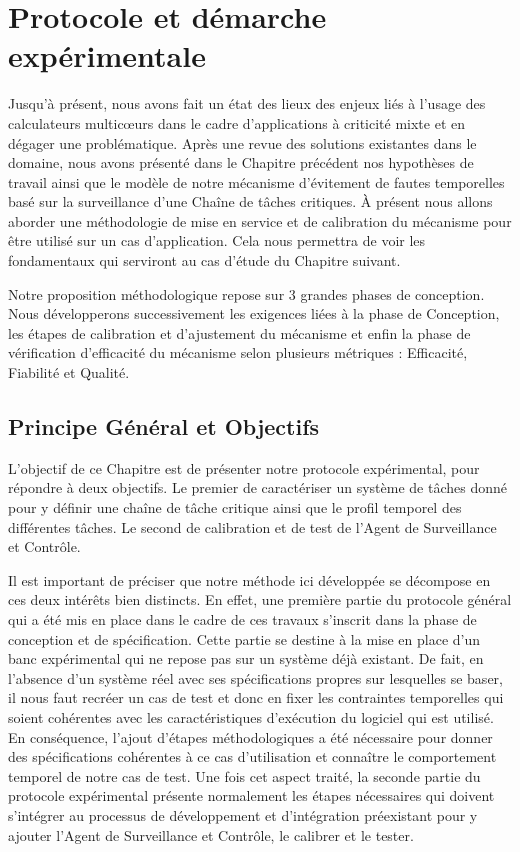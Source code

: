 \documentclass[french, a4paper, 11pt, twoside, pdftex]{StyleThese}
\begin{document}
\setcounter{chapter}{3} %
\dominitoc
\faketableofcontents
\fi

\chapter{Protocole et démarche expérimentale} \label{chap:4_ProtocolExpe}
\minitoc

Jusqu'à présent, nous avons fait un état des lieux des enjeux liés à l'usage des calculateurs multicœurs dans le cadre d'applications à criticité mixte et en dégager une problématique. Après une revue des solutions existantes dans le domaine, nous avons présenté dans le Chapitre précédent nos hypothèses de travail ainsi que le modèle de notre mécanisme d'évitement de fautes temporelles basé sur la surveillance d'une Chaîne de tâches critiques. À présent nous allons aborder une méthodologie de mise en service et de calibration du mécanisme pour être utilisé sur un cas d'application. Cela nous permettra de voir les fondamentaux qui serviront au cas d'étude du Chapitre suivant. 

Notre proposition méthodologique repose sur 3 grandes phases de conception. Nous développerons successivement les exigences liées à la phase de Conception, les étapes de calibration et d'ajustement du mécanisme et enfin la phase de vérification d'efficacité du mécanisme selon plusieurs métriques : Efficacité, Fiabilité et Qualité. 


\section{Principe Général et Objectifs}
        L'objectif de ce Chapitre est de présenter notre protocole expérimental, pour répondre à deux objectifs. Le premier de caractériser un système de tâches donné pour y définir une chaîne de tâche critique ainsi que le profil temporel des différentes tâches. Le second de calibration et de test de l'Agent de Surveillance et Contrôle.
        
        Il est important de préciser que notre méthode ici développée se décompose en ces deux intérêts bien distincts. En effet, une première partie du protocole général qui a été mis en place dans le cadre de ces travaux s'inscrit dans la phase de conception et de spécification. Cette partie se destine à la mise en place d'un banc expérimental qui ne repose pas sur un système déjà existant. De fait, en l'absence d'un système réel avec ses  spécifications propres sur lesquelles se baser, il nous faut recréer un cas de test et donc en fixer les contraintes temporelles qui soient cohérentes avec les caractéristiques d'exécution du logiciel qui est utilisé. En conséquence, l'ajout d'étapes méthodologiques a été nécessaire pour donner des spécifications cohérentes à ce cas d'utilisation et connaître le comportement temporel de notre cas de test. 
        Une fois cet aspect traité, la seconde partie du protocole expérimental présente normalement les étapes nécessaires qui doivent s'intégrer au processus de développement et d'intégration préexistant pour y ajouter l'Agent de Surveillance et Contrôle, le calibrer et le tester.
        
\end{document}
